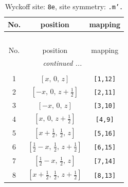 \documentclass[fleqn,8pt]{jsarticle}
\begin{document}
\begin{longtable}{ccc}
\caption{Wyckoff site: {\tt 8e}, site symmetry: {\tt .m'.}}
 \\
 \hline \hline
No. & position & mapping \\ \hline \endfirsthead

\multicolumn{2}{l}{\tablename\ \thetable{}} \\
 \hline \hline
No. & position & mapping \\ \hline \endhead

 \hline \hline
\multicolumn{2}{r}{\footnotesize\it continued ...} \\ \endfoot

 \hline \hline
\multicolumn{2}{r}{} \\ \endlastfoot

1 & $\left[ x,\, 0,\, z \right]$ & {\tt [1,12]} \\ \hline
2 & $\left[ - x,\, 0,\, z + \frac{1}{2} \right]$ & {\tt [2,11]} \\ \hline
3 & $\left[ - x,\, 0,\, z \right]$ & {\tt [3,10]} \\ \hline
4 & $\left[ x,\, 0,\, z + \frac{1}{2} \right]$ & {\tt [4,9]} \\ \hline
5 & $\left[ x + \frac{1}{2},\, \frac{1}{2},\, z \right]$ & {\tt [5,16]} \\ \hline
6 & $\left[ \frac{1}{2} - x,\, \frac{1}{2},\, z + \frac{1}{2} \right]$ & {\tt [6,15]} \\ \hline
7 & $\left[ \frac{1}{2} - x,\, \frac{1}{2},\, z \right]$ & {\tt [7,14]} \\ \hline
8 & $\left[ x + \frac{1}{2},\, \frac{1}{2},\, z + \frac{1}{2} \right]$ & {\tt [8,13]} \\
\end{longtable}
\renewcommand{\arraystretch}{1.2}
\end{document}
